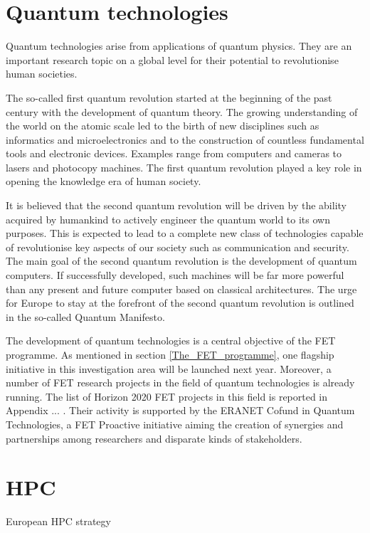 \section{Quantum technologies} \label{Quantum technologies and High-performing computers}
Quantum technologies arise from applications of quantum physics. They are an important research topic on a global level for their potential to revolutionise human societies.

The so-called first quantum revolution started at the beginning of the past century with the development of quantum theory. The growing understanding of the world on the atomic scale led to the birth of new disciplines such as informatics and microelectronics and to the construction of countless fundamental tools and electronic devices. Examples range from computers and cameras to lasers and photocopy machines. The first quantum revolution played a key role in opening the knowledge era of human society.

It is believed that the second quantum revolution will be driven by the ability acquired by humankind to actively engineer the quantum world to its own purposes. This is expected to lead to a complete new class of technologies capable of revolutionise key aspects of our society such as communication and security. The main goal of the second quantum revolution is the development of quantum computers. If successfully developed, such machines will be far more powerful than any present and future computer based on classical architectures. The urge for Europe to stay at the forefront of the second quantum revolution is outlined in the so-called Quantum Manifesto.


The development of quantum technologies is a central objective of the FET programme. As mentioned in section \ref{The_FET_programme}, one flagship initiative in this investigation area will be launched next year. Moreover, a number of FET research projects in the field of quantum technologies is already running. The list of Horizon 2020 FET projects in this field is reported in Appendix ... . Their activity is supported by the ERANET Cofund in Quantum Technologies, a FET Proactive initiative aiming the creation of synergies and partnerships among researchers and disparate kinds of stakeholders. 

\section{HPC}

 European HPC strategy